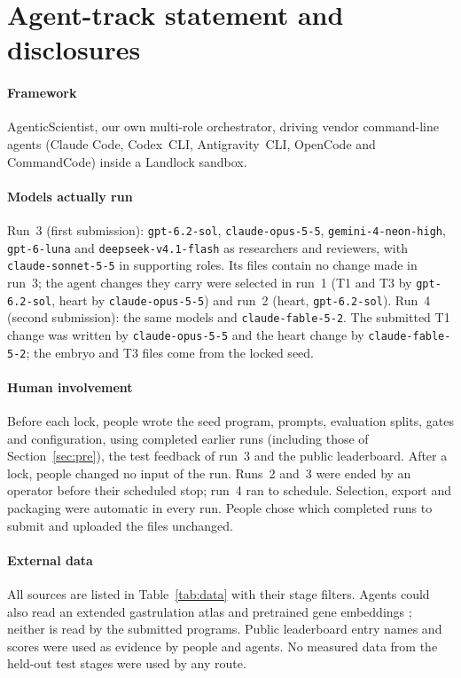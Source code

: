 \documentclass[9pt,twocolumn,a4paper]{extarticle}
\newcommand{\code}[1]{\texttt{\small #1}}
\begin{document}
\section{Agent-track statement and disclosures}

\paragraph{Framework} AgenticScientist, our own multi-role orchestrator, driving vendor command-line agents (Claude
Code, Codex~CLI, Antigravity~CLI, OpenCode and CommandCode) inside a Landlock sandbox.

\paragraph{Models actually run} Run~3 (first submission): \code{gpt-6.2-sol}, \code{claude-opus-5-5},
\code{gemini-4-neon-high}, \code{gpt-6-luna} and \code{deepseek-v4.1-flash} as researchers and reviewers, with
\code{claude-sonnet-5-5} in supporting roles. Its files contain no change made in run~3; the agent changes they
carry were selected in run~1 (T1 and T3 by \code{gpt-6.2-sol}, heart by \code{claude-opus-5-5}) and run~2 (heart,
\code{gpt-6.2-sol}). Run~4 (second submission): the same models and \code{claude-fable-5-2}. The submitted T1
change was written by \code{claude-opus-5-5} and the heart change by \code{claude-fable-5-2}; the embryo and T3
files come from the locked seed.

\paragraph{Human involvement} Before each lock, people wrote the seed program, prompts, evaluation splits, gates and
configuration, using completed earlier runs (including those of Section~\ref{sec:pre}), the test feedback of run~3
and the public leaderboard. After a lock, people changed no input of the run. Runs~2 and~3 were ended by an operator
before their scheduled stop; run~4 ran to schedule. Selection, export and packaging were automatic in every run.
People chose which completed runs to submit and uploaded the files unchanged.

\paragraph{External data} All sources are listed in Table~\ref{tab:data} with their stage filters. Agents could also read an extended gastrulation atlas \cite{imaz2024extended} and pretrained gene embeddings \cite{theodoris2023geneformer}; neither is read by the submitted programs. Public leaderboard entry names and scores were used as evidence by people and agents. No measured data from the held-out test stages were used by any route.
\end{document}
